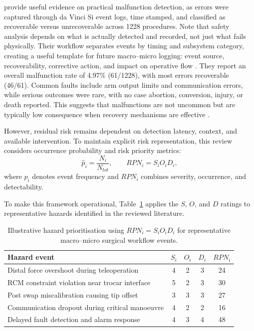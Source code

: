 \documentclass[12pt]{article}
\begin{document}
\textcite{rajih2017error} provide useful evidence on practical
malfunction detection, as errors were captured through da Vinci Si event logs,
time stamped, and classified as recoverable versus unrecoverable across 1228
procedures. Note that safety analysis depends on
what is actually detected and recorded, not just what fails physically.
Their workflow separates events by timing and subsystem category, creating a useful
template for future macro--micro logging: event source, recoverability,
corrective action, and impact on operative flow \parencite{rajih2017error}.
They report an overall malfunction rate of 4.97\% (61/1228), with most errors
recoverable (46/61). Common faults include arm output limits and communication
errors, while serious outcomes were rare, with no case abortion, conversion,
injury, or death reported. This suggests that malfunctions are not uncommon but
are typically low consequence when recovery mechanisms are effective
\parencite{rajih2017error}.

However, residual risk remains dependent on detection latency, context, and
available intervention. To maintain explicit risk representation, this review
considers occurrence probability and risk priority metrics:
\begin{equation}
\hat{p}_i=\frac{N_i}{N_{tot}}, \qquad RPN_i=S_iO_iD_i,
\end{equation}
where $\hat{p}_i$ denotes event frequency and $RPN_i$ combines severity,
occurrence, and detectability.

To make this framework operational, Table~\ref{tab:rpn_hazards} applies
the $S$, $O$, and $D$ ratings to representative hazards identified in the
reviewed literature.

\begin{table}[H]
\centering
\small
\renewcommand{\arraystretch}{1.2}
\begin{tabular}{|p{9cm}|c|c|c|c|}
\hline
\textbf{Hazard event} & \textbf{$S_i$} & \textbf{$O_i$} & \textbf{$D_i$} & \textbf{$RPN_i$} \\
\hline
Distal force overshoot during teleoperation & 4 & 2 & 3 & 24 \\
\hline
RCM constraint violation near trocar interface & 5 & 2 & 3 & 30 \\
\hline
Post swap miscalibration causing tip offset & 3 & 3 & 3 & 27 \\
\hline
Communication dropout during critical manoeuvre & 4 & 2 & 2 & 16 \\
\hline
Delayed fault detection and alarm response & 4 & 3 & 4 & 48 \\
\hline
\end{tabular}
\caption[Indicative RPN Hazard Prioritisation]{Illustrative hazard prioritisation using $RPN_i=S_iO_iD_i$ for representative macro--micro surgical workflow events.}
\label{tab:rpn_hazards}
\end{table}
\end{document}
